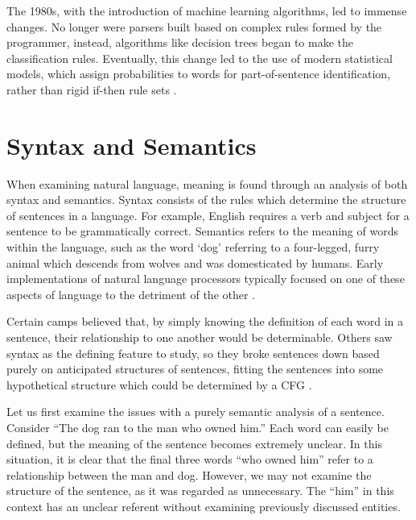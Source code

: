 The 1980s, with the introduction of machine learning algorithms, led to immense changes. No longer were parsers built based on complex rules formed by the programmer, instead, algorithms like decision trees began to make the classification rules. Eventually, this change led to the use of modern statistical models, which assign probabilities to words for part-of-sentence identification, rather than rigid if-then rule sets \cite{1980}.

\section{Syntax and Semantics}

When examining natural language, meaning is found through an analysis of both syntax and semantics. Syntax consists of the rules which determine the structure of sentences in a language. For example, English requires a verb and subject for a sentence to be grammatically correct. Semantics refers to the meaning of words within the language, such as the word `dog' referring to a four-legged, furry animal which descends from wolves and was domesticated by humans. Early implementations of natural language processors typically focused on one of these aspects of language to the detriment of the other \cite{lytinen}.

Certain camps believed that, by simply knowing the definition of each word in a sentence, their relationship to one another would be determinable. Others saw syntax as the defining feature to study, so they broke sentences down based purely on anticipated structures of sentences, fitting the sentences into some hypothetical structure which could be determined by a CFG \cite{lytinen}.

Let us first examine the issues with a purely semantic analysis of a sentence. Consider ``The dog ran to the man who owned him.'' Each word can easily be defined, but the meaning of the sentence becomes extremely unclear. In this situation, it is clear that the final three words ``who owned him'' refer to a relationship between the man and dog. However, we may not examine the structure of the sentence, as it was regarded as unnecessary. The ``him'' in this context has an unclear referent without examining previously discussed entities.

